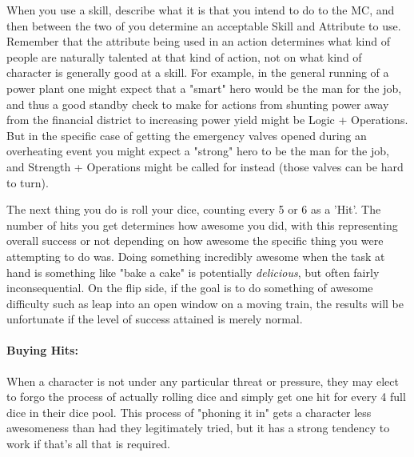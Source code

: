 \hspace{\parindent} When you use a skill, describe what it is that you intend to do to the MC, and then between the two of you determine an acceptable Skill and Attribute to use. Remember that the attribute being used in an action determines what kind of people are naturally talented at that kind of action, not on what kind of character is generally good at a skill. For example, in the general running of a power plant one might expect that a "smart" hero would be the man for the job, and thus a good standby check to make for actions from shunting power away from the financial district to increasing power yield might be Logic + Operations. But in the specific case of getting the emergency valves opened during an overheating event you might expect a "strong" hero to be the man for the job, and Strength + Operations might be called for instead (those valves can be hard to turn).

The next thing you do is roll your dice, counting every 5 or 6 as a 'Hit'. The number of hits you get determines how awesome you did, with this representing overall success or not depending on how awesome the specific thing you were attempting to do was. Doing something incredibly awesome when the task at hand is something like "bake a cake" is potentially \textit{delicious}, but often fairly inconsequential. On the flip side, if the goal is to do something of awesome difficulty such as leap into an open window on a moving train, the results will be unfortunate if the level of success attained is merely normal.

\paragraph{Buying Hits:} When a character is not under any particular threat or pressure, they may elect to forgo the process of actually rolling dice and simply get one hit for every 4 full dice in their dice pool. This process of "phoning it in" gets a character less awesomeness than had they legitimately tried, but it has a strong tendency to work if that's all that is required.

